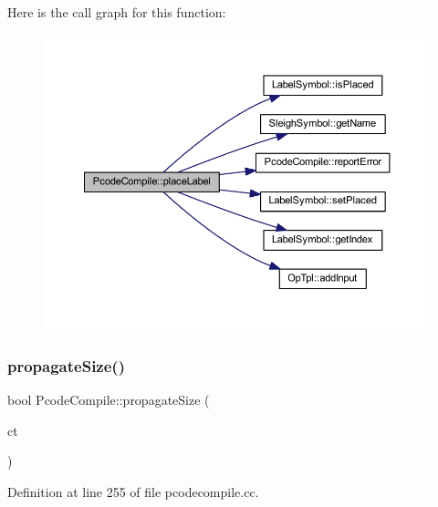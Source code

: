 Here is the call graph for this function\+:
\nopagebreak
\begin{figure}[H]
\begin{center}
\leavevmode
\includegraphics[width=350pt]{class_pcode_compile_a838d3e556360e1fd8f365453165a0cda_cgraph}
\end{center}
\end{figure}
\mbox{\label{class_pcode_compile_a107dd115ba53b9158a0c76b6a2368c52}} 
\subsubsection{\texorpdfstring{propagateSize()}{propagateSize()}}
{\footnotesize\ttfamily bool Pcode\+Compile\+::propagate\+Size (\begin{DoxyParamCaption}\item[{\mbox{\hyperlink{class_construct_tpl}{Construct\+Tpl}} $\ast$}]{ct }\end{DoxyParamCaption})\hspace{0.3cm}{\ttfamily [static]}}



Definition at line 255 of file pcodecompile.\+cc.

